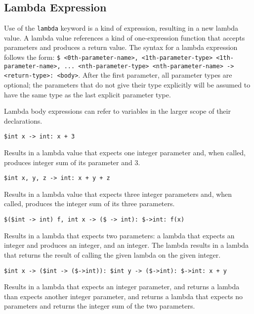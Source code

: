 
\subsection{Lambda Expression}
{
	Use of the \texttt{lambda} keyword is a kind of expression, resulting
	in a new lambda value. A lambda value references a kind of
	one-expression function that accepts parameters and produces a return value.
	The syntax for a lambda expression follows the
	form: \texttt{\$<0th-parameter-type> <0th-parameter-name>,
	<1th-parameter-type> <1th-parameter-name>, ... <nth-parameter-type>
	<nth-parameter-name> -> <return-type>: <body>}.
	After the first parameter, all parameter types are optional; the
	parameters that do not give their type explicitly will be assumed to
	have the same type as the last explicit parameter type.
	
	Lambda body expressions can refer to variables in the larger scope of their
	declarations.
	
	\begin{itemize}
	{
		\item[] \texttt{\$int x -> int: x + 3}
		
			Results in a lambda value that expects
			one integer parameter and, when called, produces integer sum
			of its parameter and 3.
		
		\item[] \texttt{\$int x, y, z -> int: x + y + z}
		
			Results in a lambda value that expects
			three integer parameters and, when called, produces the integer sum
			of its three parameters.
		
		\item[] \texttt{\$(\$int -> int) f, int x -> (\$ -> int): \$->int: f(x)}
		
			Results in a lambda that expects two parameters:
			a lambda that expects an integer and produces an integer,
			and an integer. The lambda results in a lambda that returns the
			result of calling the given lambda on the given integer.
		
		\item[] \texttt{\$int x -> (\$int -> (\$->int)): \$int y -> (\$->int): \$->int: x + y}
		
			Results in a lambda that expects an integer parameter, and returns
			a lambda than expects another integer parameter, and returns
			a lambda that expects no parameters and returns the integer sum
			of the two parameters.
	}
	\end{itemize}
}














